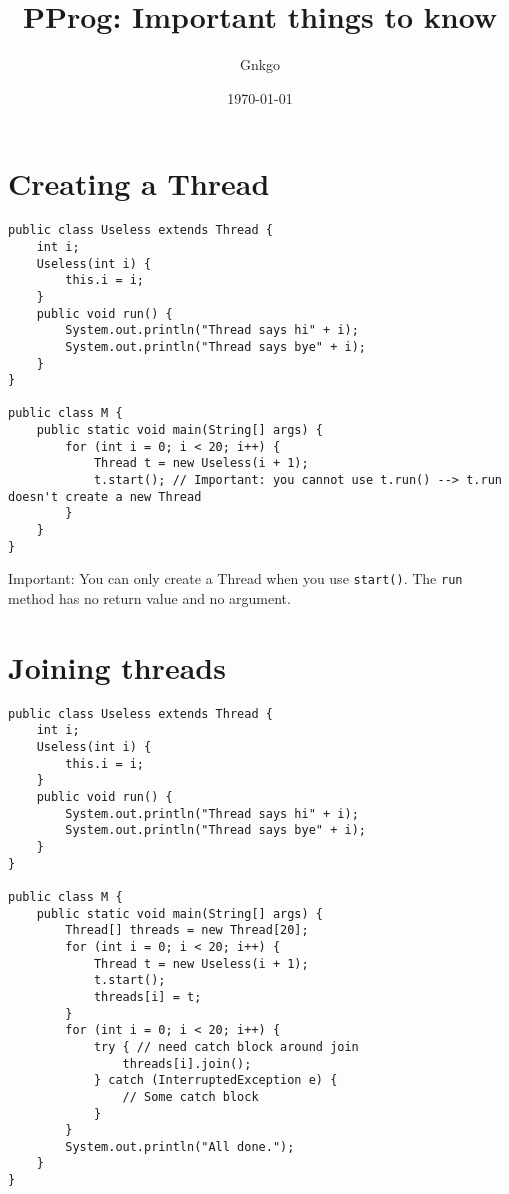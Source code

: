 \documentclass{article}
\title{PProg: Important things to know}
\author{Gnkgo}
\date{\today}
\begin{document}
\maketitle

\clearpage

\tableofcontents

\clearpage

\section{Creating a Thread}

\begin{lstlisting}
public class Useless extends Thread {
    int i;
    Useless(int i) {
        this.i = i;
    }
    public void run() {
        System.out.println("Thread says hi" + i);
        System.out.println("Thread says bye" + i);
    }
}

public class M {
    public static void main(String[] args) {
        for (int i = 0; i < 20; i++) {
            Thread t = new Useless(i + 1);
            t.start(); // Important: you cannot use t.run() --> t.run doesn't create a new Thread
        }
    }
}
\end{lstlisting}

Important: You can only create a Thread when you use \texttt{start()}. The \texttt{run} method has no return value and no argument.

\section{Joining threads}

\begin{lstlisting}
public class Useless extends Thread {
    int i;
    Useless(int i) {
        this.i = i;
    }
    public void run() {
        System.out.println("Thread says hi" + i);
        System.out.println("Thread says bye" + i);
    }
}

public class M {
    public static void main(String[] args) {
        Thread[] threads = new Thread[20];
        for (int i = 0; i < 20; i++) {
            Thread t = new Useless(i + 1);
            t.start();
            threads[i] = t;
        }
        for (int i = 0; i < 20; i++) {
            try { // need catch block around join
                threads[i].join();
            } catch (InterruptedException e) {
                // Some catch block
            }
        }
        System.out.println("All done.");
    }
}
\end{lstlisting}
\end{document}
